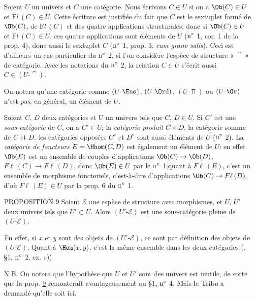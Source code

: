 Soient $U$ un univers et $C$ une catégorie. Nous écrivons $C\in U$
si on a $\Ob(C)\in U$ et $%
\mathrm{F}{}l\, (C)\in U$. Cette écriture est justifiée du fait que
$C$ est le sextuplet formé de $\Ob(C)$, de
$\mathrm{F}{}l\,(C)$ et des quatre applications structurales; donc
si $\Ob(C)\in U$ et
$\mathrm{F}{}l\,(C)\in U$, ces quatre applications sont éléments de
$U$ (${\rm n^{\circ}}$ 1, cor. 1 de la prop. 4), donc aussi le
sextuplet $C$ (${\rm n^{\circ}}$ 1, prop. 3, \textit{cum grano
salis}). Ceci est d'ailleurs un cas particulier du ${\rm n^{\circ}}$
2, si l'on considère l'espèce de structure « $\cat$ » de catégorie.
Avec les notations du ${\rm n^{\circ}}$ 2, la relation $C\in U$
s'écrit aussi $C\in (U\text{-}\cat)$.

On notera qu'une catégorie comme $(U\text{-}\Ens)$,
$(U\text{-}\Ord)$, $(U\text{-}\Top)$ ou $(U\text{-}\Gr)$ n'est
\emph{pas}, en général, un élément de $U$.

Soient $C$, $D$ deux catégories et $U$ un univers tels que $C$,
$D\in U$. Si $C'$ est une \emph{sous-catégorie} de $C$, on a $C'\in
U$; la \emph{catégorie produit} $C\times D$, la catégorie somme de
$C$ et $D$, les catégories opposées $C^{\circ}$ et $D^{\circ}$ sont
aussi éléments de $U$ (\cf ${\rm n^{\circ}}$ 2). La \emph{catégorie
de foncteurs} $E=\Hhom(C,D)$ est également un élément de $U$: en
effet $\Ob(E)$ est un ensemble de couples d'applications
$\Ob(C)\rightarrow \Ob(D)$, $F\ell\, (C)\rightarrow F\ell\, (D)$,
donc $\Ob(E)\in U$ par le ${\rm n^{\circ}}$ 1;\pageoriginale quant à
$F\ell\, (E)$, c'est un ensemble de morphisme fonctoriels,
c'est-à-dire d'applications $\Ob(C)\rightarrow F\ell\, (D)$, d'où $
F\ell\, (E)\in U$ par la prop. 6 du ${\rm n^{\circ}}$ 1.

\begin{enonce*}{PROPOSITION 9}
Soient $\mathcal{E}$ une espèce de structure avec morphismes, et
$U$, $U'$ deux univers tels que $U'\subset U$. Alors
$(U'\text{-}\mathcal{E})$ est une sous-catégorie pleine de
$(U\text{-}\mathcal{E})$.
\end{enonce*}

En effet, si $x$ et $y$ sont des objets de
$(U'\text{-}\mathcal{E})$, ce sont par définition des objets de
$(U\text{-}\mathcal{E})$. Quant à $\Hom(x,y)$, c'est la même
ensemble dans les deux catégories (\cf. \S 1, ${\rm n^{\circ}}$ 2,
ex. c)).

N.B. On notera que l'hypothèse que $U$ et $U'$ sont des univers %
est inutile, de sorte que la prop. \hyperref[I.sec9]{9} remonterait avantageusement au
\S 1, ${\rm n^{\circ}}$ 4. Mais la Tribu a demandé qu'elle soit ici.

